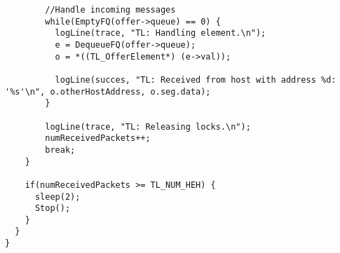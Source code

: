 \begin{lstlisting}
        //Handle incoming messages
        while(EmptyFQ(offer->queue) == 0) {
          logLine(trace, "TL: Handling element.\n");
          e = DequeueFQ(offer->queue);
          o = *((TL_OfferElement*) (e->val));

          logLine(succes, "TL: Received from host with address %d: '%s'\n", o.otherHostAddress, o.seg.data);
        }

        logLine(trace, "TL: Releasing locks.\n");
        numReceivedPackets++;
        break;
    }

    if(numReceivedPackets >= TL_NUM_HEH) {
      sleep(2);
      Stop();
    }
  }
}
\end{lstlisting}




\hfill \break

